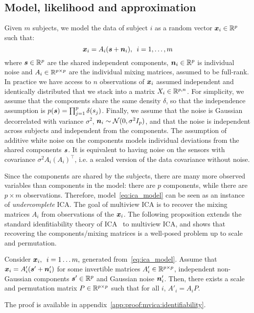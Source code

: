 \subsection{Model, likelihood and approximation}
%
Given $m$ subjects, we model the data of subject $i$ as a random vector
$\boldsymbol{x}_i\in\mathbb{R}^p$  such that:
\begin{equation}
\label{eq:ica_model}
    \boldsymbol{x}_i = A_i(\boldsymbol{s} + \boldsymbol{n}_i), \enspace i=1,\dots, m
\end{equation}
where $\boldsymbol{s} \in \mathbb{R}^p$ are the shared independent components, $\boldsymbol{n}_i \in
\mathbb{R}^p$ is individual noise and $A_i \in \mathbb{R}^{p\times p}$ are the individual mixing matrices, assumed to be full-rank.
In practice we have access to $n$ observations of $\boldsymbol{x}_i$ assumed independent
and identically distributed that we stack into a
matrix $X_i \in \mathbb{R}^{p, n}$.
%
For simplicity, we assume that the components share the same density $\delta$, so that the independence assumption is $p(\boldsymbol{s}) = \prod_{j=1}^p \delta(s_j)$. Finally, we assume that the noise is Gaussian decorrelated with variance $\sigma^2$, $\boldsymbol{n}_i \sim \mathcal{N}(0, \sigma^2I_p)$, and that the noise is independent across subjects and independent from the components.
The assumption of additive white noise on the components models individual deviations from the shared components $\boldsymbol{s}$.
It is equivalent to having noise on the sensors with covariance $\sigma^2 A_i \left(A_i\right)^{\top}$, i.e. a scaled version of the data covariance without noise.

Since the components are shared by the subjects, there are many more observed variables than components in the model: there are $p$ components, while there are $p \times m$ observations.
%
Therefore, model~\eqref{eq:ica_model} can be seen as an instance of \emph{undercomplete} ICA.
%
The goal of multiview ICA is to recover the mixing matrices $A_i$ from observations of the $\boldsymbol{x}_i$.
%
The following proposition extends the standard idenfitiability theory of ICA~\cite{comon1994independent} to multiview ICA, and shows that recovering the components/mixing matrices is a well-posed problem up to scale and permutation.
%
\begin{proposition}
\label{prop:identifiability}
Consider $\boldsymbol{x}_i, \enspace i=1\dots m,$ generated from~\eqref{eq:ica_model}. Assume that $\boldsymbol{x}_i = A'_i(\boldsymbol{s}' + \boldsymbol{n}'_i)$ for some invertible matrices $A'_i\in \mathbb{R}^{p\times p}$, independent non-Gaussian components $\boldsymbol{s}'\in \mathbb{R}^p$ and Gaussian noise $\boldsymbol{n}'_i$. Then, there exists a scale and permutation matrix $P\in \mathbb{R}^{p\times p}$ such that for all $i$, $A'_i = A_i P$.
\end{proposition}
The proof is available in appendix~\ref{app:proof:mvica:identifiability}.

